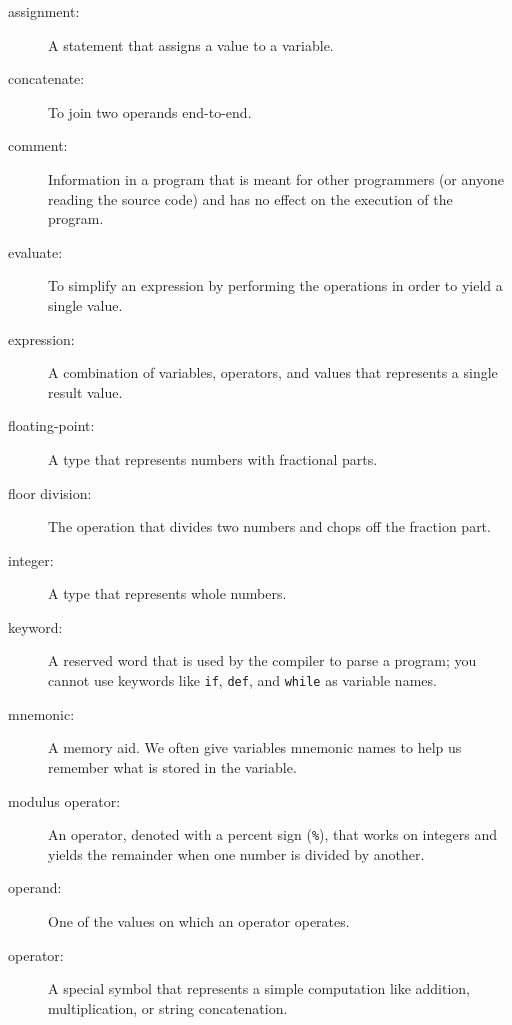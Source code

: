 \documentclass[10pt]{book}
\begin{document}
\begin{description}

\item[assignment:]  A statement that assigns a value to a variable.

\item[concatenate:]  To join two operands end-to-end.

\item[comment:]  Information in a program that is meant for other
programmers (or anyone reading the source code) and has no effect on the
execution of the program.

\item[evaluate:]  To simplify an expression by performing the operations
in order to yield a single value.

\item[expression:]  A combination of variables, operators, and values that
represents a single result value.

\item[floating-point:] A type that represents numbers with fractional
parts.

\item[floor division:] The operation that divides two numbers and chops off
the fraction part.

\item[integer:] A type that represents whole numbers.

\item[keyword:]  A reserved word that is used by the compiler to parse a
program; you cannot use keywords like {\tt if}, {\tt  def}, and {\tt while} as
variable names.

\item[mnemonic:] A memory aid. We often give variables mnemonic names
to help us remember what is stored in the variable.

\item[modulus operator:]  An operator, denoted with a percent sign
({\tt \%}), that works on integers and yields the remainder when one
number is divided by another.

\item[operand:]  One of the values on which an operator operates.

\item[operator:]  A special symbol that represents a simple computation like
addition, multiplication, or string concatenation.


\end{description}
\end{document}
